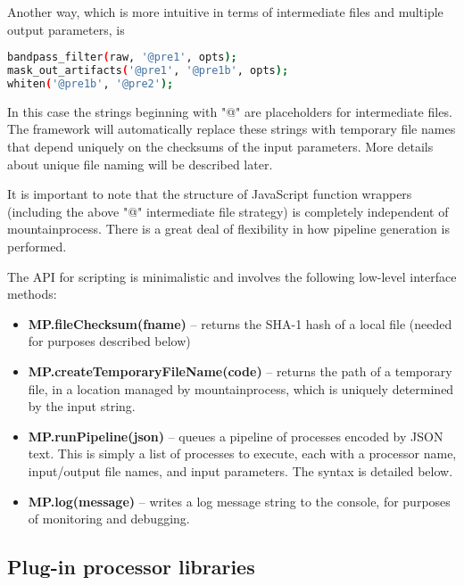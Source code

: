 \documentclass{article}
\begin{document}
Another way, which is more intuitive in terms of intermediate files and multiple output parameters, is
\begin{lstlisting}[language=bash]
bandpass_filter(raw, '@pre1', opts);
mask_out_artifacts('@pre1', '@pre1b', opts);
whiten('@pre1b', '@pre2');
\end{lstlisting}
In this case the strings beginning with "@" are placeholders for intermediate files. The framework will automatically replace these strings with temporary file names that depend uniquely on the checksums of the input parameters. More details about unique file naming will be described later.

It is important to note that the structure of JavaScript function wrappers (including the above "@" intermediate file strategy) is completely independent of mountainprocess. There is a great deal of flexibility in how pipeline generation is performed.

The API for scripting is minimalistic and involves the following low-level interface methods:
\begin{itemize}
\item{\textbf{MP.fileChecksum(fname)} -- returns the SHA-1 hash of a local file (needed for purposes described below)}
\item{\textbf{MP.createTemporaryFileName(code)} -- returns the path of a temporary file, in a location managed by mountainprocess, which is uniquely determined by the input string.}
\item{\textbf{MP.runPipeline(json)} -- queues a pipeline of processes encoded by JSON text. This is simply a list of processes to execute, each with a processor name, input/output file names, and input parameters. The syntax is detailed below.}
\item{\textbf{MP.log(message)} -- writes a log message string to the console, for purposes of monitoring and debugging.}

\end{itemize}

\subsection{Plug-in processor libraries}
\end{document}
